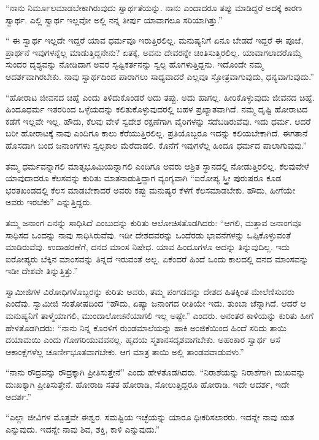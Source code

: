  “ನಾನು ನಿರ್ಮೂಲಮಾಡಬೇಕಾಗಿರುವುದು ಸ್ವಾರ್ಥತೆಯನ್ನು. ನಾನು ಎಂದಾದರೂ ತಪ್ಪು ಮಾಡಿದ್ದರೆ ಅದಕ್ಕೆ ಕಾರಣ ಸ್ವಾರ್ಥ. ಎಲ್ಲಿ ಸ್ವಾರ್ಥ ಇಲ್ಲವೋ‌ ಅಲ್ಲಿ ನನ್ನ ತೀರ್ಪು ಯಾವಾಗಲೂ ಸರಿಯಾಗಿತ್ತು.” 

 “ ಈ ಸ್ವಾರ್ಥ ಇಲ್ಲದೇ ಇದ್ದರೆ ಯಾವ ಧರ್ಮವೂ ಇರುತ್ತಿರಲಿಲ್ಲ. ಮನುಷ್ಯನಿಗೆ ಏನೂ ಬೇಡದೆ ಇದ್ದರೆ ಈ ಪೂಜೆ, ಪ್ರಾರ್ಥನೆ ಇವುಗಳನ್ನೆಲ್ಲ ಮಾಡುತ್ತಿದ್ದನೇನು? ಏತಕ್ಕೆ, ಅವನು ದೇವರನ್ನೇ ಚಿಂತಿಸುತ್ತಿರಲಿಲ್ಲ. ಯಾವಾಗಲಾದರೊಮ್ಮೆ ಸುಂದರ ದೃಶ್ಯವನ್ನು ನೋಡಿದಾಗ ಅವರ ಸೃಷ್ಟಿಕರ್ತನನ್ನು ಸ್ವಲ್ಪ ಹೊಗಳುತ್ತಿದ್ದನು. ಇದೊಂದೇ ನಮ್ಮ ಆದರ್ಶವಾಗಿರಬೇಕು. ನಾವು ಸ್ವಾರ್ಥದಿಂದ ಪಾರಾಗಲು ಸಾಧ್ಯವಾದರೆ ಎಲ್ಲವೂ ಸ್ತೋತ್ರವಾಗುವುದು, ಧನ್ಯವಾಗುವುದು.” 

 “ಹೋರಾಟ ಜೀವನದ ಚಿಹ್ನೆ ಎಂದು ತಿಳಿದುಕೊಂಡರೆ ಅದು ತಪ್ಪು. ಅದು ಹಾಗಲ್ಲ. ಹೀರಿಕೊಳ್ಳುವುದು ಜೀವನದ ಚಿಹ್ನೆ. ಹಿಂದೂಧರ್ಮ ಇತರರಿಂದ ಒಳ್ಳೆಯದನ್ನು ಕಲಿತುಕೊಳ್ಳುವುದರಲ್ಲಿ ಬಹಳ ಪ್ರಖ್ಯಾತವಾಗಿದೆ. ನಮ್ಮ ದೃಷ್ಟಿ ಹೋರಾಟದ ಕಡೆಗೆ ಇಲ್ಲವೇ ಇಲ್ಲ. ಹೌದು, ಕೆಲವು ವೇಳೆ ಸ್ವದೇಶ ರಕ್ಷಣೆಗಾಗಿ ವೈರಿಗಳನ್ನು ಸದೆಬಡಿರುವೆವು. ಇದು ಧರ್ಮ. ಆದರೆ ಬರೀ ಹೋರಾಟಕ್ಕೆ ನಾವು ಎಂದಿಗೂ ಕಾಲು ಕೆರೆಯುತ್ತಿರಲಿಲ್ಲ. ಪ್ರತಿಯೊಬ್ಬರೂ ಇದನ್ನು ಕಲಿಯಬೇಕಾಗಿದೆ. ಈಗತಾನೆ ಹೊಸದಾಗಿ ಬಂದ ಜನಾಂಗಗಳು ಸ್ವಲ್ಪಕಾಲ ಮೆರೆದಾಡಲಿ. ಕೊನೆಗೆ ಇವುಗಳೆಲ್ಲ ಹಿಂದೂ ಧರ್ಮದ ಪಾಲಾಗುವುವು.” 

 ತಮ್ಮ ಧರ್ಮವನ್ನಾಗಲಿ ಮಾತೃಭೂಮಿಯನ್ನಾಗಲಿ ಎಂದಿಗೂ ಅವರು ಆಶ್ರಿತ ಸ್ಥಾನದಲ್ಲಿ ನೋಡುತ್ತಿರಲಿಲ್ಲ. ಕೆಲವುವೇಳೆ ಯಾವುದಾದರೂ ಕೆಲಸವನ್ನು ಕುರಿತು ಮಾತನಾಡುತ್ತಿದ್ದಾಗ ವ್ಯಂಗ್ಯವಾಗಿ “ಐರೋಪ್ಯ ಸ್ತ್ರೀ ಪುರುಷರೂ ಕೂಡ ಭರತಖಂಡದಲ್ಲಿ ಕೆಲಸ ಮಾಡಬೇಕಾದರೆ ಅವರು ಕಪ್ಪು ಮನುಷ್ಯರ ಕೆಳಗೆ ಕೆಲಸಮಾಡಬೇಕು. ಹೌದು, ಹೀಗೆಯೇ ಅವರು ಇರಬೆಕು” ಎನ್ನುತ್ತಿದ್ದರು. 

 ತಮ್ಮ ಜನಾಂಗ ಏನನ್ನು ಸಾಧಿಸಿದೆ ಎಂಬುದನ್ನು ಕುರಿತು ಆಲೋಚಿಸತೊಡಗಿದರು: “ಆಗಲಿ, ಮತ್ತಾವ ಜನಾಂಗವೂ ಸಾಧಿಸದ ಒಂದನ್ನು ನಾವು ಸಾಧಿಸಿರುವೆವು. ಇಡೀ ದೇಶದವರನ್ನು ಒಂದೆರಡು ಭಾವನೆಗಳನ್ನು ಒಪ್ಪಿಕೊಳ್ಳುವಂತೆ ಮಾಡಿರುವೆವು. ಉದಾಹರಣೆಗೆ, ದನದ ಮಾಂಸ ನಿಷೇಧ. ಯಾವ ಹಿಂದೂಗಳೂ ಅದನ್ನು ತಿನ್ನುವುದಿಲ್ಲ. ಇದು ಐರೋಪ್ಯರು ಬೆಕ್ಕಿನ ಮಾಂಸವನ್ನು ತಿನ್ನದೆ ಇರುವಂತೆ ಅಲ್ಲ. ಏಕೆಂದರೆ ಹಿಂದೆ ಒಂದು ಕಾಲದಲ್ಲಿ ದನದ ಮಾಂಸವನ್ನು ಇಡೀ ದೇಶವೇ ತಿನ್ನುತ್ತಿತ್ತು.” 

 ಸ್ವಾಮೀಜಿಗಳ ವಿರೋಧಿಗಳೊಬ್ಬರನ್ನು ಕುರಿತು ಅವರು, ತಮ್ಮ ಪಂಗಡವನ್ನು ದೇಶದ ಹಿತಕ್ಕಿಂತ ಮೇಲೆಣಿಸುವರು ಎಂದೆವು. ಸ್ವಾಮೀಜಿ ಸಂತೋಷದಿಂದ “ಹೌದು, ಏಷ್ಯಾ ಜನಾಂಗದ ರೀತಿಯೇ ಇದು. ತುಂಬಾ ಚೆನ್ನಾಗಿದೆ. ಆದರೆ ಆ ಮನುಷ್ಯನಿಗೆ ತಾಳ್ಮೆಯಾಗಲಿ, ಮುಂದಾಲೋಚನೆಯಾಗಲಿ ಇಲ್ಲ ಅಷ್ಟೇ.” ಎಂದರು. ಅನಂತರ ಕಾಳಿಯನ್ನು ಕುರಿತು ಹೀಗೆ ಹೇಳತೊಡಗಿದರು: “ನಾನು ನಿನ್ನ ಕೊರಳಿಗೆ ರುಂಡಮಾಲೆಯನ್ನು ಹಾಕಿ ಅಂಜಿಕೆಯಿಂದ ಹಿಂದೆ ಸರಿದು ತಾಯಿ ದಯಾಮಯಿ ಎಂದು ಗೋಗರಿಯುವವನಲ್ಲ. ಹೃದಯ ಸ್ಮಶಾನಸದೃಶವಾಗಬೇಕು. ಅಹಂಕಾರ ಸ್ವಾರ್ಥ ಆಸೆ ಆಕಾಂಕ್ಷೆಗಳೆಲ್ಲ ಚೂರ್ಣೀಭೂತವಾಗಬೇಕು. ಆಗ ಮಾತ್ರ ತಾಯಿ ಅಲ್ಲಿ ತಾಂಡವವಾಡುವಳು.” 

 “ನಾನು ರೌದ್ರವನ್ನು ರೌದ್ರಕ್ಕಾಗಿ ಪ್ರೀತಿಸುತ್ತೇನೆ” ಎಂದು ಹೇಳತೊಡಗಿದರು. “ನಿರಾಶೆಯನ್ನು ನಿರಾಶೆಗಾಗಿ ದುಃಖವನ್ನು ದುಃಖಕ್ಕಾಗಿ ಪ್ರೀತಿಸುತ್ತೇನೆ. ಹೋರಾಡಿ ಸತತ ಹೋರಾಡಿ, ಸೋಲುತ್ತಿದ್ದರೂ ಹೋರಾಡಿ. ಇದೇ ಆದರ್ಶ, ಇದೇ ಆದರ್ಶ.” 

 “ಎಲ್ಲಾ ಜೀವಿಗಳ ಮೊತ್ತವೇ ಈಶ್ವರ. ಸಮಷ್ಟಿಯ ಇಚ್ಛೆಯನ್ನು ಯಾರೂ ಧಿಃಕರಿಸಲಾರರು. ಇದನ್ನೇ ನಾವು ಋತ ಎನ್ನುವುದು. ಇದನ್ನೇ ನಾವು ಶಿವ, ಶಕ್ತಿ, ಕಾಳಿ ಎನ್ನುವುದು.” 

